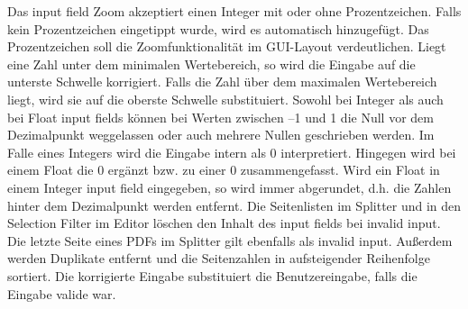 Das input field Zoom akzeptiert einen Integer mit oder ohne Prozentzeichen. Falls kein Prozentzeichen eingetippt wurde, wird es automatisch hinzugefügt. Das Prozentzeichen soll die Zoomfunktionalität im GUI-Layout verdeutlichen. Liegt eine Zahl unter dem minimalen Wertebereich, so wird die Eingabe auf die unterste Schwelle korrigiert. Falls die Zahl über dem maximalen Wertebereich liegt, wird sie auf die oberste Schwelle substituiert. Sowohl bei Integer als auch bei Float input fields können bei Werten zwischen –1 und 1 die Null vor dem Dezimalpunkt weggelassen oder auch mehrere Nullen geschrieben werden. Im Falle eines Integers wird die Eingabe intern als 0 interpretiert. Hingegen wird bei einem Float die 0 ergänzt bzw. zu einer 0 zusammengefasst. Wird ein Float in einem Integer input field eingegeben, so wird immer abgerundet, d.h. die Zahlen hinter dem Dezimalpunkt werden entfernt. Die Seitenlisten im Splitter und in den Selection Filter im Editor löschen den Inhalt des input fields bei invalid input. Die letzte Seite eines PDFs im Splitter gilt ebenfalls als invalid input. Außerdem werden Duplikate entfernt und die Seitenzahlen in aufsteigender Reihenfolge sortiert. Die korrigierte Eingabe substituiert die Benutzereingabe, falls die Eingabe valide war. 

